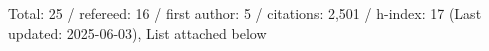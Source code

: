 Total: 25 / refereed: 16 / first author: 5 / citations: 2,501 / h-index: 17 (Last updated: 2025-06-03), List attached below